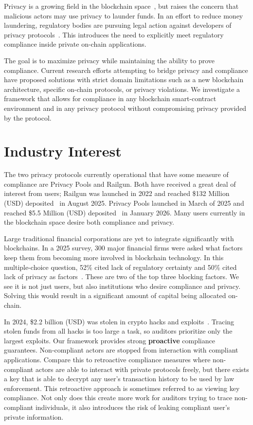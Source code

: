 \documentclass[9pt]{extreport}
\begin{document}
Privacy is a growing field in the blockchain space~\cite{tornadocash, 7503, ZcashWhitepaper, ultraanon}, but raises the concern that malicious actors may use privacy to launder funds.  In an effort to reduce money laundering, regulatory bodies are pursuing legal action against developers of privacy protocols~\cite{kuhn_samourai_2024,doj_tornado_cash_2023,bitcoin_fog_2021}.  This introduces the need to explicitly meet regulatory compliance inside private on-chain applications.

The goal is to maximize privacy while maintaining the ability to prove compliance.  Current research efforts attempting to bridge privacy and compliance have proposed solutions with strict domain limitations such as a new blockchain architecture, specific on-chain protocols, or privacy violations.  We investigate a framework that allows for compliance in any blockchain smart-contract environment and in any privacy protocol without compromising privacy provided by the protocol.

\section{Industry Interest}
The two privacy protocols currently operational that have some measure of compliance are Privacy Pools and Railgun.  Both have received a great deal of interest from users; Railgun was launched in 2022 and reached \$132 Million (USD) deposited~\cite{defillama2025railgun} in August 2025. Privacy Pools launched in March of 2025 and reached \$5.5 Million (USD) deposited~\cite{defillama2025privacypools} in January 2026.  Many users currently in the blockchain space desire both compliance and privacy.

Large traditional financial corporations are yet to integrate significantly with blockchains.  In a 2025 survey, 300 major financial firms were asked what factors keep them from becoming more involved in blockchain technology. In this multiple-choice question, 52\% cited lack of regulatory certainty and 50\% cited lack of privacy as factors~\cite{paradigm2025tradfi}.  These are two of the top three blocking factors.  We see it is not just users, but also institutions who desire compliance and privacy.  Solving this would result in a significant amount of capital being allocated on-chain.

In 2024, \$2.2 billion (USD) was stolen in crypto hacks and exploits~\cite{trmlabs2025cryptocrime}.  Tracing stolen funds from all hacks is too large a task, so auditors prioritize only the largest exploits.  Our framework provides strong \textbf{proactive} compliance guarantees.  Non-compliant actors are stopped from interaction with compliant applications.  Compare this to retroactive compliance measures where non-compliant actors are able to interact with private protocols freely, but there exists a key that is able to decrypt any user's transaction history to be used by law enforcement.  This retroactive approach is sometimes referred to as viewing key compliance.  Not only does this create more work for auditors trying to trace non-compliant individuals, it also introduces the risk of leaking compliant user's private information.
\end{document}
